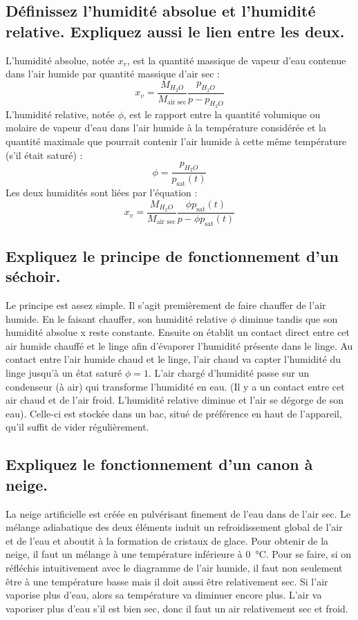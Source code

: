 \subsection{Définissez l'humidité absolue et l'humidité relative. Expliquez aussi le lien entre les deux.}
L'humidité absolue, notée $x_v$, est la quantité massique de vapeur d'eau contenue dans l'air humide par quantité massique d'air sec :
\begin{equation} x_v = \frac{M_{H_2O}}{M_\text{air sec}}\frac{p_{H_2O}}{p-p_{H_2O}} \end{equation}
L'humidité relative, notée $\phi$, est le rapport entre la quantité volumique ou molaire de vapeur d'eau dans l'air humide à la température considérée et la quantité maximale que pourrait contenir l'air humide à cette même température (s'il était saturé) :
\begin{equation} \phi = \frac{p_{H_2O}}{p_\text{sat}(t)} \end{equation}
Les deux humidités sont liées par l'équation :
\begin{equation} x_v = \frac{M_{H_2O}}{M_\text{air sec}}\frac{\phi p_\text{sat}(t)}{p-\phi p_\text{sat}(t)} \end{equation}

\subsection{Expliquez le principe de fonctionnement d'un séchoir.}
Le principe est assez simple. Il s’agit premièrement de faire chauffer de l’air humide. En le faisant chauffer, son humidité relative $\phi$ diminue tandis que son humidité absolue x reste constante. Ensuite on établit un contact direct entre cet air humide chauffé et le linge afin d’évaporer l’humidité présente dans le linge. Au contact entre l’air humide chaud et le linge, l’air chaud va capter l’humidité du linge jusqu’à un état saturé $\phi = 1$. L’air chargé d’humidité passe sur un condenseur (à air) qui transforme l’humidité en eau. (Il y a un contact entre cet air chaud et de l’air froid. L’humidité relative diminue et l’air se dégorge de son eau). Celle-ci est stockée dans un bac, situé de préférence en haut de l’appareil, qu’il suffit de vider régulièrement.

\subsection{Expliquez le fonctionnement d'un canon à neige.}
La neige artificielle est créée en pulvérisant finement de l’eau dans de l’air sec. Le mélange adiabatique des deux éléments induit un refroidissement global de l’air et de l’eau et aboutit à la formation de cristaux de glace. Pour obtenir de la neige, il faut un mélange à une température inférieure à \SI{0}{\celsius}. Pour se faire, si on réfléchis intuitivement avec le diagramme de l’air humide, il faut non seulement être à une température basse mais il doit aussi être relativement sec. Si l’air vaporise plus d’eau, alors sa température va diminuer encore plus. L’air va vaporiser plus d’eau s’il est bien sec, donc il faut un air relativement sec et froid. 

